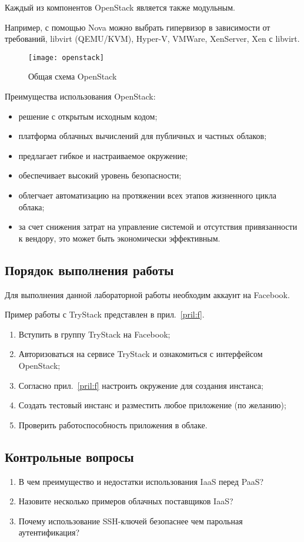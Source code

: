 Каждый из компонентов OpenStack является также модульным.

Например, с помощью Nova можно выбрать гипервизор в зависимости от требований, libvirt (QEMU/KVM), Hyper-V, VMWare, XenServer, Xen с libvirt.

\clearpage

\begin{figure}[ht]
    \centering
    \texttt{[image: openstack]}
    \caption{Общая схема OpenStack}\label{pic:openstack}
\end{figure}

Преимущества использования OpenStack:
\begin{itemize}
    \item решение с открытым исходным кодом;
    \item платформа облачных вычислений для публичных и частных облаков;
    \item предлагает гибкое и настраиваемое окружение;
    \item обеспечивает высокий уровень безопасности;
    \item облегчает автоматизацию на протяжении всех этапов жизненного цикла облака;
    \item за счет снижения затрат на управление системой и отсутствия привязанности к вендору, это может быть экономически эффективным.
\end{itemize}

\subsection{Порядок выполнения работы}

Для выполнения данной лабораторной работы необходим аккаунт на Facebook.

Пример работы с TryStack представлен в прил.~\ref{pril:f}.

\begin{enumerate}
    \item Вступить в группу TryStack на Facebook;
    \item Авторизоваться на сервисе TryStack и ознакомиться с интерфейсом OpenStack;
    \item Согласно прил.~\ref{pril:f} настроить окружение для создания инстанса;
    \item Создать тестовый инстанс и разместить любое приложение (по желанию);
    \item Проверить работоспособность приложения в облаке.
\end{enumerate}

\subsection{Контрольные вопросы}
\begin{enumerate}
    \item В чем преимущество и недостатки использования IaaS перед PaaS?
    \item Назовите несколько примеров облачных поставщиков IaaS?
    \item Почему использование SSH-ключей безопаснее чем парольная аутентификация?
\end{enumerate}

\clearpage
